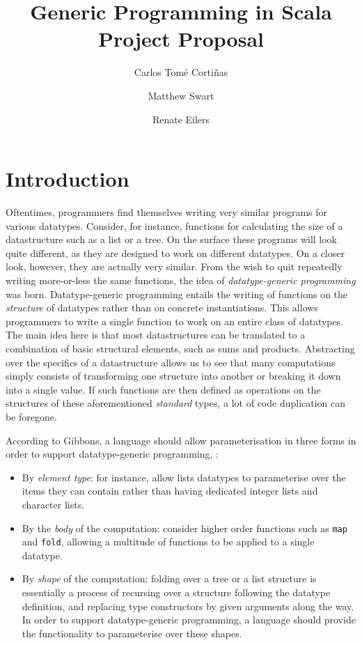 \documentclass{article}
\title{Generic Programming in Scala \\
\large{Project Proposal}}
\author{Carlos Tomé Cortiñas
\and Matthew Swart
\and Renate Eilers}
\begin{document}
\maketitle

\section{Introduction} 

Oftentimes, programmers find themselves writing very similar programs for various datatypes. Consider, for instance, functions for  calculating the size of a datastructure such as a list or a tree. On the surface these programs will look quite different, as they are designed to work on different datatypes. On a closer look, however, they are actually very similar. From the wish to quit repeatedly writing more-or-less the same functions, the idea of \emph{datatype-generic programming} was born. Datatype-generic programming entails the writing of functions on the \emph{structure} of datatypes rather than on concrete instantiations. This allows programmers to write a single function to work on an entire class of datatypes. The main idea here is that most datastructures can be translated to a combination of basic structural elements, such as sums and products. Abstracting over the specifics of a datastructure allows us to see that many computations simply consists of transforming one structure into another or breaking it down into a single value. If such functions are then defined as operations on the structures of these aforementioned \emph{standard} types, a lot of code duplication can be foregone. 

According to Gibbons\cite{Gibbons06designpatterns}, a language should allow parameterisation in three forms in order to support datatype-generic programming, :
\begin{itemize}
\setlength\itemsep{0em}
	\item By \emph{element type}: for instance, allow lists datatypes to parameterise over the items they can contain rather than having dedicated integer lists and character lists.	
	\item By the \emph{body} of the computation: consider higher order functions such as \texttt{map} and \texttt{fold}, allowing a multitude of functions to be applied to a single datatype.
	\item By \emph{shape} of the computation: folding over a tree or a list structure is essentially a process of recursing over a structure following the datatype definition, and replacing type constructors by given arguments along the way. In order to support datatype-generic programming, a language should provide the functionality to parameterise over these shapes.
\end{itemize}
\end{document}
